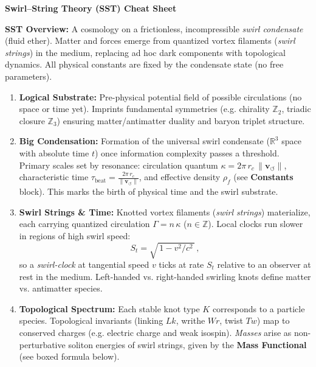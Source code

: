 \documentclass[10pt,a4paper]{article}
\begin{document}
\begin{center}\Large\textbf{Swirl--String Theory (SST) Cheat Sheet}\end{center}

\noindent \textbf{SST Overview:} A cosmology on a frictionless, incompressible \emph{swirl condensate} (fluid ether). Matter and forces emerge from quantized vortex filaments (\emph{swirl strings}) in the medium, replacing ad hoc dark components with topological dynamics. All physical constants are fixed by the condensate state (no free parameters).

\begin{tcolorbox}[title=\textbf{Cosmogenesis: Sevenfold Genesis of the Swirling Cosmos}]
\begin{enumerate}\itemsep1pt
\item \textbf{Logical Substrate:} Pre-physical potential field of possible circulations (no space or time yet). Imprints fundamental symmetries (e.g. chirality $\mathbb{Z}_2$, triadic closure $\mathbb{Z}_3$) ensuring matter/antimatter duality and baryon triplet structure.
\item \textbf{Big Condensation:} Formation of the universal swirl condensate ($\mathbb{R}^3$ space with absolute time $t$) once information complexity passes a threshold. Primary scales set by resonance: circulation quantum $\kappa = 2\pi\,r_c\,\| \mathbf{v}_{\!\boldsymbol{\circlearrowleft}}\|$, characteristic time $\tau_{\text{beat}} = \frac{2\pi\,r_c}{\| \mathbf{v}_{\!\boldsymbol{\circlearrowleft}}\|}$, and effective density $\rho_{\!f}$ (see \textbf{Constants} block). This marks the birth of physical time and the swirl substrate.
\item \textbf{Swirl Strings \& Time:} Knotted vortex filaments (\emph{swirl strings}) materialize, each carrying quantized circulation $\Gamma = n\,\kappa$ ($n\in\mathbb{Z}$). Local clocks run slower in regions of high swirl speed:
\[
    S_t = \sqrt{\,1 - v^2/c^2\,}\,,
\]
so a \textit{swirl-clock} at tangential speed $v$ ticks at rate $S_t$ relative to an observer at rest in the medium. Left-handed vs. right-handed swirling knots define matter vs. antimatter species.
\item \textbf{Topological Spectrum:} Each stable knot type $K$ corresponds to a particle species. Topological invariants (linking $Lk$, writhe $Wr$, twist $Tw$) map to conserved charges (e.g. electric charge and weak isospin). \textit{Masses} arise as non-perturbative soliton energies of swirl strings, given by the \textbf{Mass Functional} (see boxed formula below).

\end{enumerate}
\end{tcolorbox}
\end{document}

